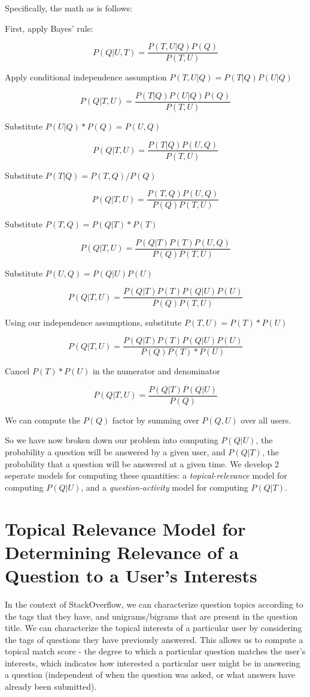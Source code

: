 \documentclass[a4paper]{article}
\begin{document}
Specifically, the math as is follows:

First, apply Bayes' rule:

\[ P(Q|U,T) = \frac{P(T,U|Q)P(Q)}{P(T,U)} \]

Apply conditional independence assumption $P(T,U|Q) = P(T|Q)P(U|Q)$

\[ P(Q|T,U) = \frac{P(T|Q)P(U|Q)P(Q)}{P(T,U)} \]

Substitute $P(U|Q)*P(Q) = P(U,Q)$

\[ P(Q|T,U) = \frac{P(T|Q)P(U,Q)}{P(T,U)} \]

Substitute $P(T|Q) = P(T,Q) / P(Q)$

\[ P(Q|T,U) = \frac{P(T,Q)P(U,Q)}{P(Q)P(T,U)} \]

Substitute $P(T,Q) = P(Q|T)*P(T)$

\[ P(Q|T,U) = \frac{P(Q|T)P(T)P(U,Q)}{P(Q)P(T,U)} \]

Substitute $P(U,Q) = P(Q|U)P(U)$

\[ P(Q|T,U) = \frac{P(Q|T)P(T)P(Q|U)P(U)}{P(Q)P(T,U)} \]

Using our independence assumptions, substitute $P(T,U) = P(T)*P(U)$

\[ P(Q|T,U) = \frac{P(Q|T)P(T)P(Q|U)P(U)}{P(Q)P(T)*P(U)} \]

Cancel $P(T)*P(U)$ in the numerator and denominator

\[ P(Q|T,U) = \frac{P(Q|T)P(Q|U)}{P(Q)} \]

We can compute the $P(Q)$ factor by summing over $P(Q,U)$ over all users.

So we have now broken down our problem into computing $P(Q|U)$, the probability a question will be answered by a given user, and $P(Q|T)$, the probability that a question will be answered at a given time. We develop 2 seperate models for computing these quantities: a \emph{topical-relevance} model for computing $P(Q|U)$, and a \emph{question-activity} model for computing $P(Q|T)$.

\section{Topical Relevance Model for Determining Relevance of a Question to a User's Interests}

In the context of StackOverflow, we can characterize question topics according to the tags that they have, and unigrams/bigrams that are present in the question title. We can characterize the topical interests of a particular user by considering the tags of questions they have previously answered. This allows us to compute a topical match score - the degree to which a particular question matches the user's interests, which indicates how interested a particular user might be in answering a question (independent of when the question was asked, or what answers have already been submitted).
\end{document}
